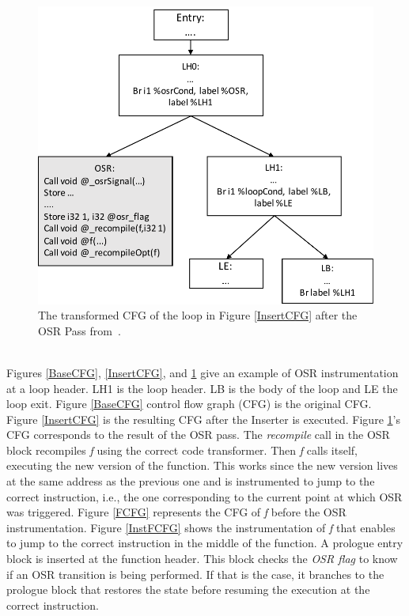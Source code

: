 \begin{figure}[h]
\centering
\includegraphics[scale=0.5]{Figures/OSRPassCFG}
\decoRule
\caption[The transformed CFG of the loop in Figure \ref{InsertCFG} after the OSR Pass]{The transformed CFG of the loop in Figure \ref{InsertCFG} after the OSR Pass from~\cite{lameed2013modular}.}
\label{OSRPassCFG}
\end{figure}\\

Figures \ref{BaseCFG}, \ref{InsertCFG}, and \ref{OSRPassCFG} give an example of OSR instrumentation at a loop header.
LH1 is the loop header. 
LB is the body of the loop and LE the loop exit. 
Figure \ref{BaseCFG} control flow graph (CFG) is the original CFG. 
Figure \ref{InsertCFG} is the resulting CFG after the Inserter is executed.
Figure \ref{OSRPassCFG}'s CFG corresponds to the result of the OSR pass.
The \textit{recompile} call in the OSR block recompiles \textit{f} using the correct code transformer.
Then \textit{f} calls itself, executing the new version of the function.
This works since the new version lives at the same address as the previous one and is instrumented to jump to the correct instruction, i.e., the one corresponding to the current point at which OSR was triggered.
Figure \ref{FCFG} represents the CFG of \textit{f} before the OSR instrumentation.
Figure \ref{InstFCFG} shows the instrumentation of \textit{f} that enables to jump to the correct instruction in the middle of the function. 
A prologue entry block is inserted at the function header.
This block checks the \textit{OSR flag} to know if an OSR transition is being performed.
If that is the case, it branches to the prologue block that restores the state before resuming the execution at the correct instruction.\\

